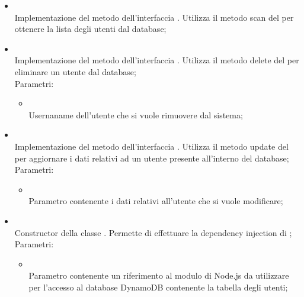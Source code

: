 \begin{itemize}
\begin{itemize}
\begin{itemize}
		\end{itemize}
		\item[]  \\
		Implementazione del metodo dell'interfaccia . Utilizza il metodo scan del  per ottenere la lista degli utenti dal database;\\
		\item[]  \\
		Implementazione del metodo dell'interfaccia . Utilizza il metodo delete del  per eliminare un utente dal database;\\
		Parametri:
		\begin{itemize}
			\item {} \\
			Usernaname dell'utente che si vuole rimuovere dal sistema;
		\end{itemize}
		\item[]  \\
		Implementazione del metodo dell'interfaccia . Utilizza il metodo update del  per aggiornare i dati relativi ad un utente presente all'interno del database;\\
		Parametri:
		\begin{itemize}
			\item {} \\
			Parametro contenente i dati relativi all'utente che si vuole modificare;
		\end{itemize}
		\item[]  \\
		Constructor della classe . Permette di effettuare la dependency injection di ;\\
		Parametri:
		\begin{itemize}
			\item {} \\
			Parametro contenente un riferimento al modulo di Node.js da utilizzare per l'accesso al database DynamoDB contenente la tabella degli utenti;
		\end{itemize}
	\end{itemize}
\end{itemize}

